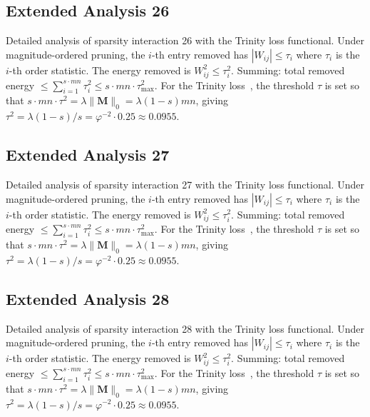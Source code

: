 \subsection{Extended Analysis 26}
\label{subsec:ext-26}

Detailed analysis of sparsity interaction 26 with the Trinity
loss functional.  Under magnitude-ordered pruning, the $i$-th entry removed has
$|W_{ij}| \leq \tau_i$ where $\tau_i$ is the $i$-th order statistic.  The
energy removed is $W_{ij}^2 \leq \tau_i^2$.  Summing: total removed energy
$\leq \sum_{i=1}^{s \cdot mn} \tau_i^2 \leq s \cdot mn \cdot \tau_{\max}^2$.
For the Trinity loss~\cite{hanetal2015deep}, the threshold $\tau$ is set so that
$s \cdot mn \cdot \tau^2 = \lambda \|\mathbf{M}\|_0 = \lambda (1-s) mn$, giving
$\tau^2 = \lambda(1-s)/s = \varphi^{-2} \cdot 0.25 \approx 0.0955$.


\subsection{Extended Analysis 27}
\label{subsec:ext-27}

Detailed analysis of sparsity interaction 27 with the Trinity
loss functional.  Under magnitude-ordered pruning, the $i$-th entry removed has
$|W_{ij}| \leq \tau_i$ where $\tau_i$ is the $i$-th order statistic.  The
energy removed is $W_{ij}^2 \leq \tau_i^2$.  Summing: total removed energy
$\leq \sum_{i=1}^{s \cdot mn} \tau_i^2 \leq s \cdot mn \cdot \tau_{\max}^2$.
For the Trinity loss~\cite{hanetal2015deep}, the threshold $\tau$ is set so that
$s \cdot mn \cdot \tau^2 = \lambda \|\mathbf{M}\|_0 = \lambda (1-s) mn$, giving
$\tau^2 = \lambda(1-s)/s = \varphi^{-2} \cdot 0.25 \approx 0.0955$.


\subsection{Extended Analysis 28}
\label{subsec:ext-28}

Detailed analysis of sparsity interaction 28 with the Trinity
loss functional.  Under magnitude-ordered pruning, the $i$-th entry removed has
$|W_{ij}| \leq \tau_i$ where $\tau_i$ is the $i$-th order statistic.  The
energy removed is $W_{ij}^2 \leq \tau_i^2$.  Summing: total removed energy
$\leq \sum_{i=1}^{s \cdot mn} \tau_i^2 \leq s \cdot mn \cdot \tau_{\max}^2$.
For the Trinity loss~\cite{hanetal2015deep}, the threshold $\tau$ is set so that
$s \cdot mn \cdot \tau^2 = \lambda \|\mathbf{M}\|_0 = \lambda (1-s) mn$, giving
$\tau^2 = \lambda(1-s)/s = \varphi^{-2} \cdot 0.25 \approx 0.0955$.


